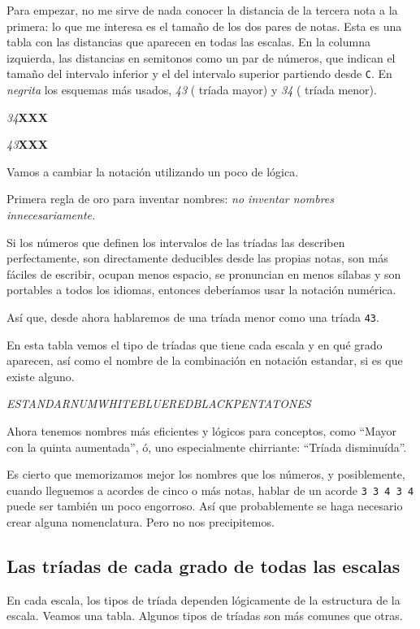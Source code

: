 \documentclass[]{article}
\begin{document}
Para empezar, no me sirve de nada conocer la distancia de la tercera nota a la primera: lo que me interesa es el tamaño de los dos pares de notas. Esta es una tabla con las distancias que aparecen en todas las escalas. En la columna izquierda, las distancias en semitonos como un par de números, que indican el tamaño del intervalo inferior y el del intervalo superior partiendo desde \texttt{C}. En \emph{negrita} los esquemas más usados, \emph{43} ( tríada mayor) y \emph{34} ( tríada menor).

 \emph{34}\textbf{X}\textbf{X}\textbf{X}

\emph{43}\textbf{X}\textbf{X}\textbf{X}

Vamos a cambiar la notación utilizando un poco de lógica.

Primera regla de oro para inventar nombres: \emph{no inventar nombres   innecesariamente.}

Si los números que definen los intervalos de las tríadas las describen perfectamente, son directamente deducibles desde las propias notas, son más fáciles de escribir, ocupan menos espacio, se pronuncian en menos sílabas y son portables a todos los idiomas, entonces deberíamos usar la notación numérica.

Así que, desde ahora hablaremos de una tríada menor como una tríada \texttt{43}.

En esta tabla vemos el tipo de tríadas que tiene cada escala y en qué grado aparecen, así como el nombre de la combinación en notación estandar, si es que existe alguno.

 \emph{ESTANDAR}\emph{NUM}\emph{WHITE}\emph{BLUE}\emph{RED}\emph{BLACK}\emph{PENTA}\emph{TONES}

 Ahora tenemos nombres más eficientes y lógicos para conceptos, como ``Mayor con la quinta aumentada'', ó, uno especialmente chirriante: ``Tríada disminuída''.

Es cierto que memorizamos mejor los nombres que los números, y posiblemente, cuando lleguemos a acordes de cinco o más notas, hablar de un acorde \texttt{3\ 3\ 4\ 3\ 4} puede ser también un poco engorroso. Así que probablemente se haga necesario crear alguna nomenclatura. Pero no nos precipitemos.

\subsection{Las tríadas de cada grado de todas las escalas}

En cada escala, los tipos de tríada dependen lógicamente de la estructura de la escala. Veamos una tabla. Algunos tipos de tríadas son más comunes que otras.
\end{document}
